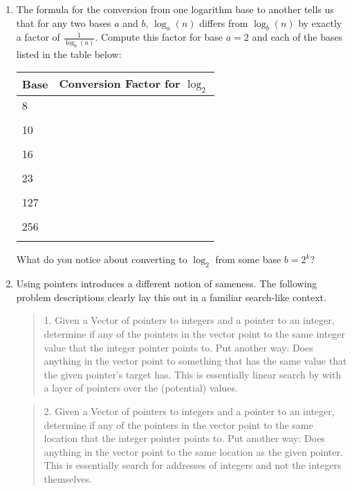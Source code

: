 \documentclass[10pt]{article}
\begin{document}
\begin{enumerate}
\item The formula for the conversion from one logarithm base to another tells us that for any two bases $a$ and $b$, $\log_a(n)$ differs from $\log_b(n)$ by exactly a factor of $\frac{1}{\log_b(a)}$. Compute this factor for base $a=2$ and each of the bases listed in the table below:

\begin{center}
\begin{tabular}{|l|l|}
\hline Base & Conversion Factor for $\log_2$ \\ \hline \hline
8 & \\
  & \\ \hline
10 & \\
  & \\ \hline
16 & \\
  & \\ \hline
23 & \\
  & \\ \hline
127 & \\
  & \\ \hline
256 & \\
  & \\ \hline
\end{tabular}
\end{center}
What do you notice about converting to $\log_2$ from some base $b=2^k$?

\newpage \thispagestyle{empty}


\item Using pointers introduces a different notion of sameness. The following problem descriptions clearly lay this out in a familiar search-like context.

\begin{quote}
1. Given a Vector of pointers to integers and a pointer to an integer, determine if any of the pointers in the vector point to the same integer value that the integer pointer points to. Put another way: Does anything in the vector point to something that has the same value that the given pointer's target has.  This is essentially linear search by with a layer of pointers over the (potential) values.
\end{quote}

\begin{quote}
2. Given a Vector of pointers to integers and a pointer to an integer, determine if any of the pointers in the vector point to the same location that the integer pointer points to.  Put another way: Does anything in the vector point to the same location as the given pointer. This is essentially search for addresses of integers and not the integers themselves.
\end{quote}


\end{enumerate}
\end{document}
